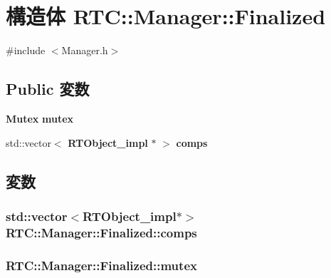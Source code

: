 \section{構造体 RTC::Manager::Finalized}
\label{structRTC_1_1Manager_1_1Finalized}


{\ttfamily \#include $<$Manager.h$>$}

\subsection*{Public 変数}
\begin{DoxyCompactItemize}
\item 
{\bf Mutex} {\bf mutex}
\item 
std::vector$<$ {\bf RTObject\_\-impl} $\ast$ $>$ {\bf comps}
\end{DoxyCompactItemize}


\subsection{変数}
\subsubsection[{comps}]{\setlength{\rightskip}{0pt plus 5cm}std::vector$<${\bf RTObject\_\-impl}$\ast$$>$ {\bf RTC::Manager::Finalized::comps}}\label{structRTC_1_1Manager_1_1Finalized_add3526b268ef3d0fd43c8603dbda9aa9}
\subsubsection[{mutex}]{ {\bf RTC::Manager::Finalized::mutex}}\label{structRTC_1_1Manager_1_1Finalized_a1d6c77f44b768021ad3f9fe06f09f590}
